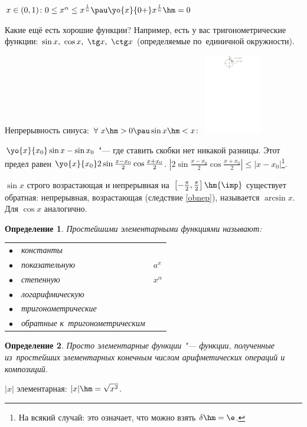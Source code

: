 \documentclass[a4paper,10pt,twoside]{article}
\newtheorem{Def}{Определение}[section]
\begin{document}
$x\in(0,1)\colon 0\leq x^\alpha\leq x^{\frac1n}\pau \yo{x}{0+}x^{\frac1n}\hm=0$

Какие ещё есть хорошие функции? Например, есть у вас тригонометрические функции:
$\sin x,\ \cos x,\ \tg x,\ \ctg x$ (определяемые по~единичной окружности).

Непрерывность синуса: $\forall\  x\hm>0\pau \sin x\hm<x\colon $ \includegraphics[height=3.5cm]{img/final/galat/vvedf/sinx.pdf}

$\yo{x}{x_0}\sin x-\sin x_0$ "--- где ставить скобки нет никакой разницы. Этот предел равен $\yo{x}{x_0}2\sin\frac{x-x_0}2\cos\frac{x+x_0}2$. $\left|
2\sin\frac{x-x_0}2\cos\frac{x+x_0}2\right|\leq|x-x_0|$\footnote{На всякий случай: это означает, что можно взять $\delta\hm=\e$.}.

$\sin x$ строго возрастающая и непрерывная на~$\left[-\frac{\pi}2,\frac{\pi}2\right]\hm{\imp}
$ существует обратная: непрерывная, возрастающая (следствие \ref{obnep}), называется $\arcsin x$. Для $\cos x$ аналогично.

\begin{Def}
    Простейшими элементарными функциями называют:

    \begin{tabular}{lll}
        $\bullet$&константы\\
        $\bullet$&показательную& $a^x$\\
        $\bullet$&степенную &$x^\alpha$\\
        $\bullet$&логарифмическую\\
        $\bullet$&тригонометрические\\
        $\bullet$&обратные к~тригонометрическим
    \end{tabular}
\end{Def}

\begin{Def}
    Просто элементарные функции "--- функции, полученные из~простейших элементарных конечным числом арифметических операций и композиций.
\end{Def}

$|x|$ элементарная: $|x|\hm=\sqrt{x^2}$.
\end{document}
